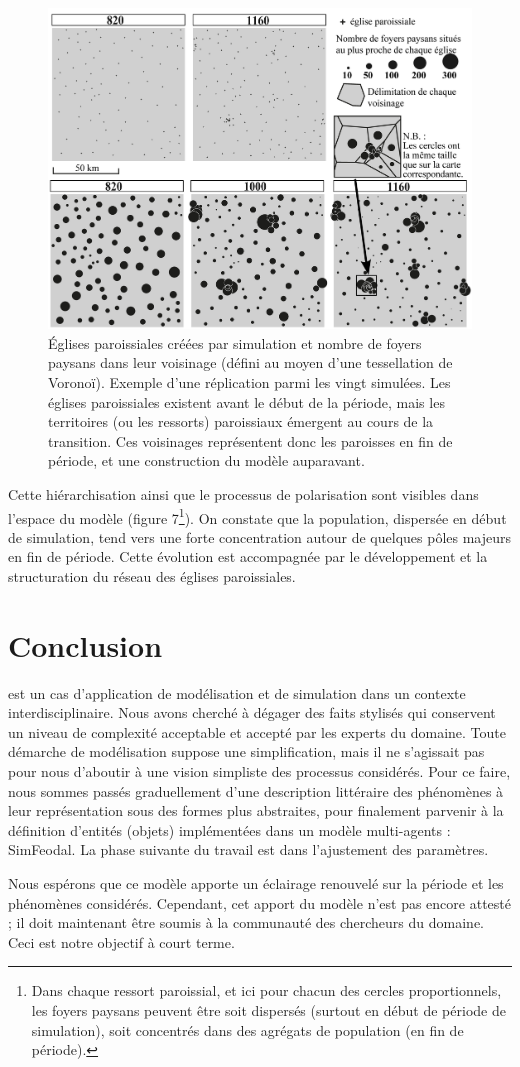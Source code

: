 \begin{figure}[!h]
	\centering
	\includegraphics[width=1\linewidth]{src/Chapitre_TMD/Fig7}
	\caption{Églises paroissiales créées par simulation et nombre de foyers paysans dans leur voisinage (défini au moyen d’une tessellation de Voronoï).
	Exemple d’une réplication parmi les vingt simulées.
	Les églises paroissiales existent avant le début de la période, mais les territoires (ou les ressorts) paroissiaux émergent au cours de la transition.
	Ces voisinages représentent donc les paroisses en fin de période, et une construction du modèle auparavant.}
	\label{fig:fig7}
\end{figure}

Cette hiérarchisation ainsi que le processus de polarisation sont visibles dans l'espace du modèle (figure 7\footnote{
Dans chaque ressort paroissial, et ici pour chacun des cercles proportionnels, les foyers paysans peuvent être soit dispersés (surtout en début de période de simulation), soit concentrés dans des agrégats de population (en fin de période).
}).
On constate que la population, dispersée en début de simulation, tend vers une forte concentration autour de quelques pôles majeurs en fin de période.
Cette évolution est accompagnée par le développement et la structuration du réseau des églises paroissiales.

\section*{Conclusion}

 est un cas d'application de modélisation et de simulation dans un contexte interdisciplinaire.
Nous avons cherché à dégager des faits stylisés qui conservent un niveau de complexité acceptable et accepté par les experts du domaine.
Toute démarche de modélisation suppose une simplification, mais il ne s'agissait pas pour nous d'aboutir à une vision simpliste des processus considérés.
Pour ce faire, nous sommes passés graduellement d'une description littéraire des phénomènes à leur représentation sous des formes plus abstraites, pour finalement parvenir à la définition d'entités (objets) implémentées dans un modèle multi-agents : SimFeodal.
La phase suivante du travail est dans l'ajustement des paramètres.

Nous espérons que ce modèle apporte un éclairage renouvelé sur la période et les phénomènes considérés.
Cependant, cet apport du modèle n'est pas encore attesté ; il doit maintenant être soumis à la communauté des chercheurs du domaine.
Ceci est notre objectif à court terme.
